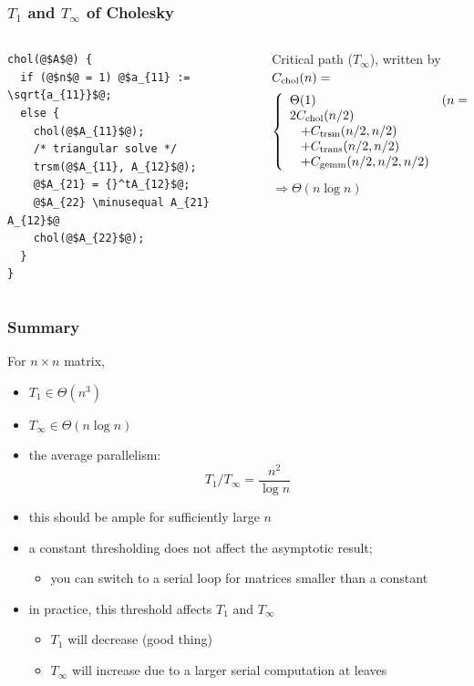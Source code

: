 \documentclass[12pt,dvipdfmx]{beamer}
\newcommand{\minusequal}{\mbox{\tt\ -= }}
\begin{document}
\begin{frame}[fragile]
\frametitle{$T_1$ and $T_\infty$ of Cholesky}
\begin{columns}
\begin{column}{0.4\textwidth}
\begin{lstlisting}[basicstyle=\scriptsize]
chol(@$A$@) {
  if (@$n$@ = 1) @$a_{11} := \sqrt{a_{11}}$@;
  else {
    chol(@$A_{11}$@);
    /* triangular solve */
    trsm(@$A_{11}, A_{12}$@);
    @$A_{21} = {}^tA_{12}$@;
    @$A_{22} \minusequal A_{21} A_{12}$@
    chol(@$A_{22}$@);
  }
}
\end{lstlisting}
\end{column}

\begin{column}{0.6\textwidth}
Critical path ($T_\infty$), written by $C_{\mbox{\scriptsize chol}}(n) = $
{\small
\[ 
\left\{
\begin{array}{ll}
\Theta(1) & (n = 1) \\
2 C_{\mbox{\scriptsize chol}}(n/2) & \\
\hspace{0.3cm} + C_{\mbox{\scriptsize trsm}}(n/2, n/2) & \\
\hspace{0.3cm} + C_{\mbox{\scriptsize trans}}(n/2, n/2) & \\
\hspace{0.3cm} + C_{\mbox{\scriptsize gemm}}(n/2, n/2, n/2) & \\
\end{array}
\right.
\]}
$\Rightarrow \Theta(n\log n)$
\end{column}
\end{columns}
\end{frame}

\begin{frame}
\frametitle{Summary}
For $n\times n$ matrix,
\begin{itemize}
\item $T_1 \in \Theta(n^3)$
\item $T_\infty \in \Theta(n \log n)$
\item the average parallelism:
\[ T_1 / T_\infty = \frac{n^2}{\log n} \]
\item this should be ample for sufficiently large $n$

\item a constant thresholding does not affect the asymptotic
  result;
  \begin{itemize}
  \item you can switch to a serial loop for matrices smaller
    than a constant
  \end{itemize}
\item in practice, this threshold affects $T_1$ and $T_\infty$
  \begin{itemize}
  \item $T_1$ will decrease (good thing)
  \item $T_\infty$ will increase due to a larger
    serial computation at leaves
  \end{itemize}
\end{itemize}
\end{frame}
\end{document}
